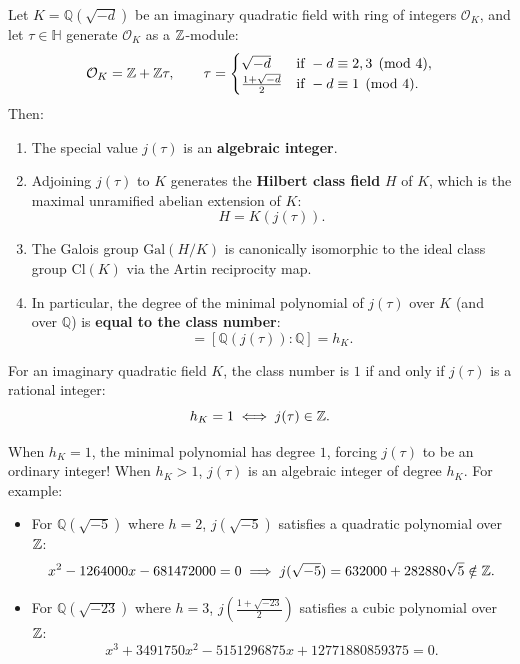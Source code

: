 \documentclass[a4paper]{article}
\begin{document}
\begin{theorem}
Let $K = \mathbb{Q}(\sqrt{-d})$ be an imaginary quadratic field with ring of integers $\mathcal{O}_K$, and let $\tau \in \mathbb{H}$ generate $\mathcal{O}_K$ as a $\mathbb{Z}$-module:
\begin{equation}
 \mathcal{O}_K = \mathbb{Z} + \mathbb{Z}\tau, \qquad \tau = \begin{cases} \sqrt{-d} & \text{if } -d \equiv 2, 3 \pmod 4, \\ \frac{1 + \sqrt{-d}}{2} & \text{if } -d \equiv 1 \pmod 4. \end{cases}
\end{equation}
Then:
\begin{enumerate}[label=(\roman*)]
 \item The special value $j(\tau)$ is an \textbf{algebraic integer}.
 \item Adjoining $j(\tau)$ to $K$ generates the \textbf{Hilbert class field} $H$ of $K$, which is the maximal unramified abelian extension of $K$:
 \begin{equation}
  H = K(j(\tau)).
 \end{equation}
 \item The Galois group $\mathrm{Gal}(H/K)$ is canonically isomorphic to the ideal class group $\mathrm{Cl}(K)$ via the Artin reciprocity map.
 \item In particular, the degree of the minimal polynomial of $j(\tau)$ over $K$ (and over $\mathbb{Q}$) is \textbf{equal to the class number}:
 \begin{equation}
  [K(j(\tau)) : K] = [\mathbb{Q}(j(\tau)) : \mathbb{Q}] = h_K.
 \end{equation}
\end{enumerate}
\end{theorem}

\begin{corollary}
For an imaginary quadratic field $K$, the class number is $1$ if and only if $j(\tau)$ is a rational integer:
\begin{equation}
 h_K = 1 \iff j(\tau) \in \mathbb{Z}.
\end{equation}
\end{corollary}

When $h_K = 1$, the minimal polynomial has degree $1$, forcing $j(\tau)$ to be an ordinary integer! When $h_K > 1$, $j(\tau)$ is an algebraic integer of degree $h_K$. For example:
\begin{itemize}[leftmargin=2em]
 \item For $\mathbb{Q}(\sqrt{-5})$ where $h = 2$, $j(\sqrt{-5})$ satisfies a quadratic polynomial over $\mathbb{Z}$:
 \begin{equation}
  x^2 - 1264000x - 681472000 = 0 \implies j(\sqrt{-5}) = 632000 + 282880\sqrt{5} \notin \mathbb{Z}.
 \end{equation}
 \item For $\mathbb{Q}(\sqrt{-23})$ where $h = 3$, $j\left(\frac{1+\sqrt{-23}}{2}\right)$ satisfies a cubic polynomial over $\mathbb{Z}$:
 \begin{equation}
  x^3 + 3491750x^2 - 5151296875x + 12771880859375 = 0.
 \end{equation}
\end{itemize}
\end{document}
